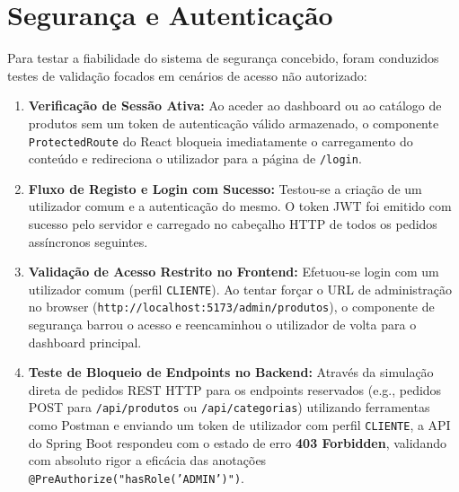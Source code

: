 \documentclass[11pt,a4paper,oneside]{report}
\begin{document}
\section{Segurança e Autenticação}
Para testar a fiabilidade do sistema de segurança concebido, foram conduzidos testes de validação focados em cenários de acesso não autorizado:
\begin{enumerate}
    \item \textbf{Verificação de Sessão Ativa:} Ao aceder ao dashboard ou ao catálogo de produtos sem um token de autenticação válido armazenado, o componente \texttt{ProtectedRoute} do React bloqueia imediatamente o carregamento do conteúdo e redireciona o utilizador para a página de \texttt{/login}.
    \item \textbf{Fluxo de Registo e Login com Sucesso:} Testou-se a criação de um utilizador comum e a autenticação do mesmo. O token JWT foi emitido com sucesso pelo servidor e carregado no cabeçalho HTTP de todos os pedidos assíncronos seguintes.
    \item \textbf{Validação de Acesso Restrito no Frontend:} Efetuou-se login com um utilizador comum (perfil \texttt{CLIENTE}). Ao tentar forçar o URL de administração no browser (\texttt{http://localhost:5173/admin/produtos}), o componente de segurança barrou o acesso e reencaminhou o utilizador de volta para o dashboard principal.
    \item \textbf{Teste de Bloqueio de Endpoints no Backend:} Através da simulação direta de pedidos REST HTTP para os endpoints reservados (e.g., pedidos POST para \texttt{/api/produtos} ou \texttt{/api/categorias}) utilizando ferramentas como Postman e enviando um token de utilizador com perfil \texttt{CLIENTE}, a API do Spring Boot respondeu com o estado de erro \textbf{403 Forbidden}, validando com absoluto rigor a eficácia das anotações \texttt{@PreAuthorize("hasRole('ADMIN')")}.
\end{enumerate}
\end{document}

